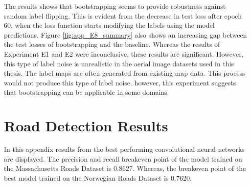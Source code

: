 The results shows that bootstrapping seems to provide robustness against random label flipping. This is evident from the decrease in test loss after epoch 60, when the loss function starts modifying the labels using the model predictions. Figure \ref{fig:app_E8_summary} also shows an increasing gap between the test losses of bootstrapping and the baseline. Whereas the results of Experiment E1 and E2 were inconclusive, these results are significant. However, this type of label noise is unrealistic in the aerial image datasets used in this thesis. The label maps are often generated from existing map data. This process would not produce this type of label noise. however, this experiment suggests that bootstrapping can be applicable in some domains. \pagebreak

\section{Road Detection Results}
\label{app:roaddetectionresults}
In this appendix results from the best performing convolutional neural networks are displayed. The precision and recall breakeven point of the model trained on the Massachusetts Roads Dataset is 0.8627. Whereas, the breakeven point of the best model trained on the Norwegian Roads Dataset is 0.7620.


